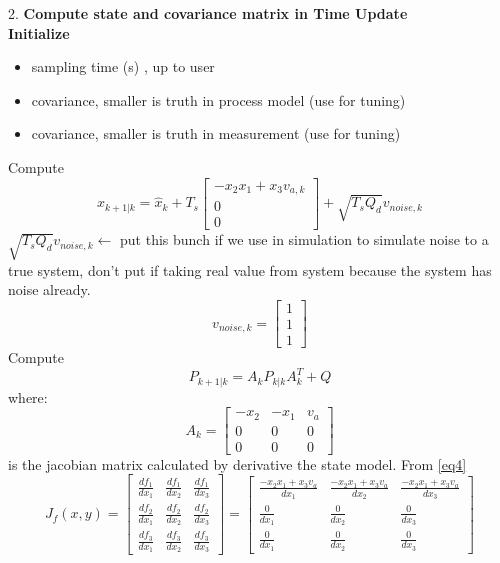 \documentclass[12pt,a4paper]{article}
\begin{document}
	2. \textbf{Compute state and covariance matrix in Time Update}\\
	\textbf{Initialize}
	\begin{itemize}
		\item { sampling time (s) , up to user}
		\item { covariance, smaller is truth in process model (use for tuning)}
		\item { covariance, smaller is truth in measurement (use for tuning)}
	\end{itemize}
	Compute \[\hat{x}_{k+1|k} = \hat{x}_k + T_s
	\begin{bmatrix}
		-x_2 x_1 + x_3 v_{a,k} \\
		0                      \\
		0                      
	\end{bmatrix} + \boxed{\sqrt{T_s Q_d}v_{noise,k}}\]
	\(\boxed{\sqrt{T_s Q_d}v_{noise,k}}\leftarrow\) put this bunch if we use in simulation to simulate noise to a true system, don't put if taking real value from system because the system has noise already.
	\[v_{noise,k} = 
	\begin{bmatrix}
		1 \\
		1 \\
		1 
	\end{bmatrix}\]
	Compute
	\[P_{k+1|k} = A_kP_{k|k}A^T_k+Q\]
	where:
	\[A_k =
	\begin{bmatrix}
		-x_2 & -x_1 & v_a \\
		0    & 0    & 0   \\
		0    & 0    & 0   
	\end{bmatrix}\]
	is the jacobian matrix calculated by derivative the state model. From \autoref{eq4}
	\[J_f(x,y) =\begin{bmatrix}
		\frac{df_1}{dx_1} & \frac{df_1}{dx_2} & \frac{df_1}{dx_3} \\
		\frac{df_2}{dx_1} & \frac{df_2}{dx_2} & \frac{df_2}{dx_3} \\
		\frac{df_3}{dx_1} & \frac{df_3}{dx_2} & \frac{df_3}{dx_3}
	\end{bmatrix} = 
	\begin{bmatrix}
		\frac{-x_2x_1+x_3v_a}{dx_1} & \frac{-x_2x_1+x_3v_a}{dx_2} & \frac{-x_2x_1+x_3v_a}{dx_3} \\
		\frac{0}{dx_1}              & \frac{0}{dx_2}              & \frac{0}{dx_3}              \\
		\frac{0}{dx_1}              & \frac{0}{dx_2}              & \frac{0}{dx_3}              
	\end{bmatrix}
	\]
\end{document}
